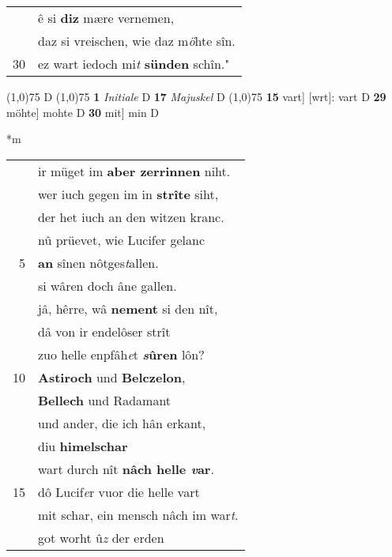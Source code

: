 \documentclass[8pt,a4paper,notitlepage]{article}
\begin{document}
\begin{table}[ht]
\begin{minipage}[t]{0.5\linewidth}
\begin{tabular}{rl}
 & ê si \textbf{diz} mære vernemen,\\ 
 & daz si vreischen, wie daz m\textit{ö}hte sîn.\\ 
30 & ez wart iedoch mi\textit{t} \textbf{sünden} schîn."\\ 
\end{tabular}
\scriptsize
\line(1,0){75} \newline
D \newline
\line(1,0){75} \newline
\textbf{1} \textit{Initiale} D  \textbf{17} \textit{Majuskel} D  \newline
\line(1,0){75} \newline
\textbf{15} vart] [wrt]: vart D \textbf{29} möhte] mohte D \textbf{30} mit] min D \newline
\end{minipage}
\hspace{0.5cm}
\begin{minipage}[t]{0.5\linewidth}
\small
\begin{center}*m
\end{center}
\begin{tabular}{rl}
 & ir müget im \textbf{aber zerrinnen} niht.\\ 
 & wer iuch gegen im in \textbf{strîte} siht,\\ 
 & der het iuch an den witzen kranc.\\ 
 & nû prüevet, wie Lucifer gelanc\\ 
5 & \textbf{an} sînen nôtges\textit{t}allen.\\ 
 & si wâren doch âne gallen.\\ 
 & jâ, hêrre, wâ \textbf{nement} si den nît,\\ 
 & dâ von ir endelôser strît\\ 
 & zuo helle enpfâh\textit{e}t \textbf{\textit{s}ûren} lôn?\\ 
10 & \textbf{Astiroch} und \textbf{Belczelon},\\ 
 & \textbf{Bellech} und Radamant\\ 
 & und ander, die ich hân erkant,\\ 
 & diu \textbf{himelschar}\\ 
 & wart durch nît \textbf{nâch helle \textit{v}ar}.\\ 
15 & dô Lucif\textit{e}r vuor die helle vart\\ 
 & mit schar, ein mensch nâch im war\textit{t}.\\ 
 & got worht û\textit{z} der erden\\ 

\end{tabular}
\end{minipage}
\end{table}
\end{document}

